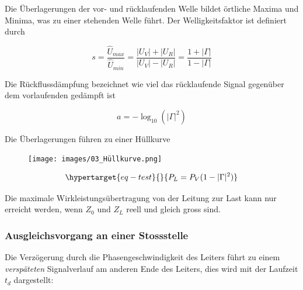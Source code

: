 \documentclass[
  10pt,
  a4paper,
  german]{article}
\numberwithin{equation}{section}
\begin{document}
Die Überlagerungen der vor- und rücklaufenden Welle bildet örtliche
Maxima und Minima, was zu einer stehenden Welle führt. Der
Welligkeitsfaktor ist definiert durch

\[
s=\frac{\hat{U}_{max}}{\hat{U}_{min}}=\frac{|U_V|+|U_R|}{|U_V|-|U_R|}=\frac{1+|\Gamma|}{1-|\Gamma|}
\]

Die Rückflussdämpfung bezeichnet wie viel das rücklaufende Signal
gegenüber dem vorlaufenden gedämpft ist

\[
a=-\log_{10}(|\Gamma|^2)
\]

Die Überlagerungen führen zu einer Hüllkurve

\begin{figure}[H]

{\centering \texttt{[image: images/03\_Hüllkurve.png]}

}

\end{figure}

\begin{equation}\protect\hypertarget{eq-test}{}{
P_L=P_V(1-|\Gamma|^2)
}\label{eq-test}\end{equation}

\begin{tcolorbox}[enhanced jigsaw, toptitle=1mm, breakable, colback=white, opacityback=0, colframe=quarto-callout-important-color-frame, bottomrule=.15mm, toprule=.15mm, bottomtitle=1mm, opacitybacktitle=0.6, coltitle=black, leftrule=.75mm, left=2mm, colbacktitle=quarto-callout-important-color!10!white, rightrule=.15mm, titlerule=0mm, title=\textcolor{quarto-callout-important-color}{\faExclamation}\hspace{0.5em}{Maximale Wirkleistungsübertragung}, arc=.35mm]

Die maximale Wirkleistungsübertragung von der Leitung zur Last kann nur
erreicht werden, wenn \(Z_0\) und \(Z_L\) reell und gleich gross sind.

\end{tcolorbox}

\hypertarget{ausgleichsvorgang-an-einer-stossstelle}{%
\subsubsection{Ausgleichsvorgang an einer
Stossstelle}\label{ausgleichsvorgang-an-einer-stossstelle}}

Die Verzögerung durch die Phasengeschwindigkeit des Leiters führt zu
einem \emph{verspäteten} Signalverlauf am anderen Ende des Leiters, dies
wird mit der Laufzeit \(t_d\) dargestellt:
\end{document}
